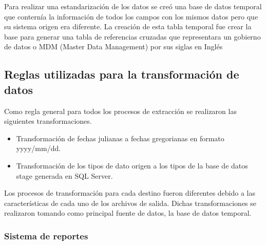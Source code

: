 \documentclass[a4paper,openright,12pt]{book}
\begin{document}
Para realizar una estandarización de los datos se creó una base de datos
temporal que conternía la información de todos los campos con los mismos datos
pero que su sistema origen era diferente. La creación de esta tabla temporal fue
crear la base para generar una tabla de referencias cruzadas que representara un
gobierno de datos o MDM (Master Data Management) por sus siglas en Inglés

\subsection{Reglas utilizadas para la transformación de datos}

Como regla general para todos los procesos de extracción se realizaron las
siguientes transformaciones.

\begin{itemize}
\item Transformación de fechas julianas a fechas gregorianas en formato
  \linebreak \mbox{yyyy/mm/dd}.
\item Transformación de los tipos de dato origen a los tipos de la base de
  datos stage generada en SQL Server.
\end{itemize}

Los procesos de transformación para cada destino fueron diferentes debido a las
características de cada uno de los archivos de salida. Dichas transformaciones
se realizaron tomando como principal fuente de datos, la base de datos temporal.

\subsubsection{Sistema de reportes}
\end{document}
